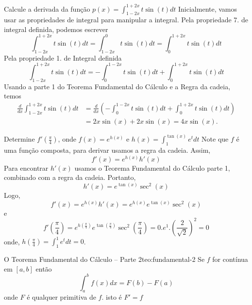 \begin{example}
  Calcule a derivada da função \(p(x)= \int_{1-2x}^{1+2x} t\sin(t)dt\)
  \solution
  Inicialmente, vamos usar as propriedades de integral para manipular a
  integral. Pela propriedade 7. de integral definida, podemos escrever
  \[
  \int_{1-2x}^{1+2x} t\sin(t)dt
  = \int_{1-2x}^{0} t\sin(t)dt
  = \int_{0}^{1+2x} t\sin(t)dt
  \]
  Pela propriedade 1. de Integral definida
  \[
  \int_{1-2x}^{1+2x} t\sin(t)dt
  = - \int_{0}^{1-2x} t\sin(t)dt
  + \int_{0}^{1+2x} t\sin(t)dt
  \]
  Usando a parte 1 do Teorema Fundamental do Cálculo e a Regra da cadeia,
  temos
  \begin{align*}
    \frac{d}{dx} \int_{1-2x}^{1+2x} t\sin(t)dt
    & = \frac{d}{dx} \left(
    - \int_{0}^{1-2x} t\sin(t)dt
    + \int_{0}^{1+2x} t\sin(t)dt
    \right) \\
    & = 2x \sin(x)+2x \sin(x)=4x\sin(x).
  \end{align*}

\end{example}

\begin{example}
  Determine $f'(\frac{\pi}{4})$,
  onde $f(x)= e^{h(x)}$ e $h(x)= \int^{\tan(x)}_1 e^t dt$
  \solution
  Note que $f$ é uma função composta, para derivar usamos a regra da cadeia.
  Assim,
  \[
  f'(x)= e^{h(x)}h'(x)
  \]
  Para encontrar $h'(x)$ usamos o Teorema Fundamental do Cálculo parte 1,
  combinado com a regra da cadeia. Portanto,
  \[
  h'(x)=e^{\tan(x)}\sec^2(x)
  \]
  Logo,
  \[
  f'(x)= e^{h(x)}h'(x)=e^{h(x)}e^{\tan(x)}\sec^2(x)
  \]
  e
  \[
  f'\left(\frac{\pi}{4}\right)
  = e^{h(\frac{\pi}{4})}
  e^{\tan(\frac{\pi}{4})}
  \sec^2\left(\frac{\pi}{4}\right)
  = 0. e^1. \left(\frac{2}{\sqrt{2}}\right)^2=0
  \]
  onde, $h\left(\frac{\pi}{4} \right)= \int_1^1 e^t dt=0$.
\end{example}

\begin{teorema}{O Teorema Fundamental do Cálculo -- Parte 2}{teo:fundamental-2}
  Se $f$ for contínua em $[a,b]$ então
  \[
  \int_a^{b}f(x)dx= F(b)-F(a)
  \]
  onde $F$ é qualquer primitiva de $f$. isto é $F'=f$
\end{teorema}

